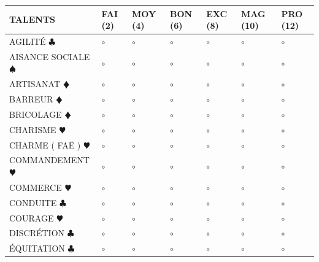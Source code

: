 \documentclass[a5paper,pagesize,french]{book}
\begin{document}
\begin{tabular}[c]{|p{}|p{}|p{}|p{}|p{}|p{}|p{}|}
	\hline
	\textbf{TALENTS}									&	FAI (2)	&	MOY (4)	&	BON (6)	&	EXC (8)	&	MAG (10)	&	PRO (12)	\\ \hline
	AGILITÉ { $\clubsuit$ }								&	$\circ$	&	$\circ$	&	$\circ$	&	$\circ$	&	$\circ$		&	$\circ$		\\ \hline
	AISANCE SOCIALE { $\spadesuit$ }					&	$\circ$	&	$\circ$	&	$\circ$	&	$\circ$	&	$\circ$		&	$\circ$		\\ \hline
	ARTISANAT {\color{red} $\vardiamond$ }				&	$\circ$	&	$\circ$	&	$\circ$	&	$\circ$	&	$\circ$		&	$\circ$		\\ \hline	
	BARREUR {\color{red} $\vardiamond$ }				&	$\circ$	&	$\circ$	&	$\circ$	&	$\circ$	&	$\circ$		&	$\circ$		\\ \hline
	BRICOLAGE {\color{red} $\vardiamond$ }				&	$\circ$	&	$\circ$	&	$\circ$	&	$\circ$	&	$\circ$		&	$\circ$		\\ \hline
	CHARISME {\color{red} $\varheart$ }					&	$\circ$	&	$\circ$	&	$\circ$	&	$\circ$	&	$\circ$		&	$\circ$		\\ \hline
	CHARME ( FAË ) {\color{red} $\varheart$ }			&	$\circ$	&	$\circ$	&	$\circ$	&	$\circ$	&	$\circ$		&	$\circ$		\\ \hline
	COMMANDEMENT {\color{red} $\varheart$ }				&	$\circ$	&	$\circ$	&	$\circ$	&	$\circ$	&	$\circ$		&	$\circ$		\\ \hline
	COMMERCE {\color{red} $\varheart$ }					&	$\circ$	&	$\circ$	&	$\circ$	&	$\circ$	&	$\circ$		&	$\circ$		\\ \hline
	CONDUITE { $\clubsuit$ }							&	$\circ$	&	$\circ$	&	$\circ$	&	$\circ$	&	$\circ$		&	$\circ$		\\ \hline
	COURAGE {\color{red} $\varheart$ }					&	$\circ$	&	$\circ$	&	$\circ$	&	$\circ$	&	$\circ$		&	$\circ$		\\ \hline
	DISCRÉTION { $\clubsuit$ }							&	$\circ$	&	$\circ$	&	$\circ$	&	$\circ$	&	$\circ$		&	$\circ$		\\ \hline
	ÉQUITATION { $\clubsuit$ }							&	$\circ$	&	$\circ$	&	$\circ$	&	$\circ$	&	$\circ$		&	$\circ$		\\ \hline

\end{tabular}
\end{document}
